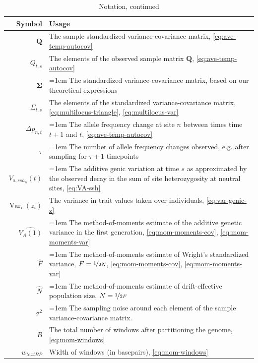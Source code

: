 \documentclass[11pt]{article}
\DeclareMathOperator{\var}{Var}
\begin{document}
\begin{table}[!htbp]
  \setcounter{table}{0}
  \caption{Notation, continued}
  \begin{tabular}{r|p{12cm}}
 Symbol & Usage  \\ \hline
 $\mathbf{Q}$ & The sample standardized variance-covariance matrix, \eqref{eq:ave-temp-autocov} \\
 $Q_{t,s}$ & The elements of the observed sample matrix $\mathbf{Q}$, \eqref{eq:ave-temp-autocov} \\
 $\mathbf{\Sigma}$ & \hangindent=1em The standardized variance-covariance matrix, based on our theoretical expressions \\
 $\Sigma_{t,s}$ & The elements of the standardized variance-covariance matrix, \eqref{eq:multilocus-triangle}, \eqref{eq:multilocus-var} \\
 $\Delta p_{n,t}$ & \hangindent=1em The allele frequency change at site $n$ between times time $t+1$ and $t$, \eqref{eq:ave-temp-autocov} \\
 $\tau$ & \hangindent=1em The number of allele frequency changes observed, e.g. after sampling for $\tau + 1$ timepoints \\
 $V_{a,ssh_n}(t)$ & \hangindent=1em The additive genic variation at time $s$ as approximated by the observed decay in the sum of site heterozygosity at neutral sites, \eqref{eq:VA-ssh} \\
 $\var_i(z_i)$ & The variance in trait values taken over individuals, \eqref{eq:var-genic-z} \\
 $\widehat{V_A(1)}$ & \hangindent=1em The method-of-moments estimate of the additive genetic variance in the first generation, \eqref{eq:mom-moments-cov}, \eqref{eq:mom-moments-var} \\
 $\widehat{F}$ & \hangindent=1em The method-of-moments estimate of Wright's standardized variance, $F = \nicefrac{1}{2N}$, \eqref{eq:mom-moments-cov}, \eqref{eq:mom-moments-var} \\
 $\widehat{N}$ & \hangindent=1em The method-of-moments estimate of drift-effective population size, $N = \nicefrac{1}{2F}$ \\
 $\sigma^2$ & \hangindent=1em The sampling noise around each element of the sample variance-covariance matrix. \\
 $B$ & The total number of windows after partitioning the genome, \eqref{eq:mom-windows} \\
 $w_{text{BP}}$ & Width of windows (in basepairs), \eqref{eq:mom-windows} \\

\end{tabular}
\end{table}
\end{document}
